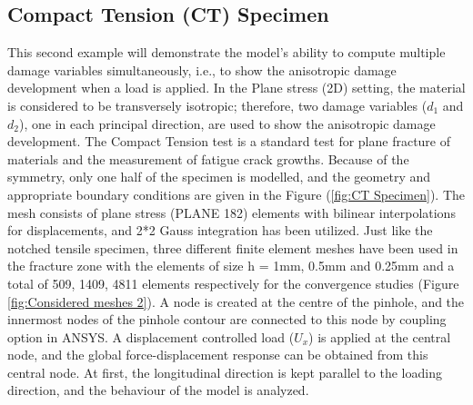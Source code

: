 \documentclass[a4paper,12pt,twoside]{report}
\begin{document}
\subsection{Compact Tension (CT) Specimen}
\indent\indent\indent   This second example will demonstrate the model's ability to compute multiple damage variables simultaneously, i.e., to show the anisotropic damage development when a load is applied. In the Plane stress (2D) setting, the material is considered to be transversely isotropic; therefore, two damage variables ($d_{1}$ and $d_{2}$), one in each principal direction, are used to show the anisotropic damage development. The Compact Tension test is a standard test for plane fracture of materials and the measurement of fatigue crack growths. Because of the symmetry, only one half of the specimen is modelled, and the geometry and appropriate boundary conditions are given in the Figure (\ref{fig:CT Specimen}). The mesh consists of plane stress (PLANE 182) elements with bilinear interpolations for displacements, and 2*2 Gauss integration has been utilized. Just like the notched tensile specimen, three different finite element meshes have been used in the fracture zone with the elements of size h = 1mm, 0.5mm and 0.25mm and a total of 509, 1409, 4811 elements respectively for the convergence studies (Figure \ref{fig:Considered meshes 2}).  A node is created at the centre of the pinhole, and the innermost nodes of the pinhole contour are connected to this node by coupling option in ANSYS. A displacement controlled load ($U_{x}$) is applied at the central node, and the global force-displacement response can be obtained from this central node.  At first, the longitudinal direction is kept parallel to the loading direction, and the behaviour of the model is analyzed.
\end{document}
